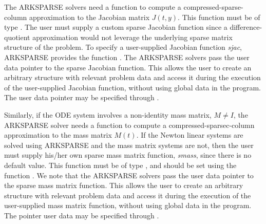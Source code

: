 \documentclass[letterpaper,10pt,english]{sphinxmanual}
\begin{document}
The ARKSPARSE solvers need a function to compute a
compressed-sparse-column approximation to the Jacobian matrix
\(J(t,y)\). This function must be of type
{\hyperref[c_interface/User_supplied:c.ARKSlsSparseJacFn]{\emph{}}}.  The user must supply a custom sparse
Jacobian function since a difference-quotient approximation would not
leverage the underlying sparse matrix structure of the problem.  To
specify a user-supplied Jacobian function \emph{sjac}, ARKSPARSE provides
the function {\hyperref[c_interface/User_callable:c.ARKSlsSetSparseJacFn]{\emph{}}}. The ARKSPARSE solvers
pass the user data pointer to the sparse Jacobian function.  This
allows the user to create an arbitrary structure with relevant problem
data and access it during the execution of the user-supplied Jacobian
function, without using global data in the program. The user
data pointer may be specified through {\hyperref[c_interface/User_callable:c.ARKodeSetUserData]{\emph{}}}.

Similarly, if the ODE system involves a non-identity mass matrix,
\(M\ne I\), the ARKSPARSE solver needs a function to compute a
compressed-sparsec-column approximation to the mass matrix
\(M(t)\).  If the Newton linear systems are solved using ARKSPARSE
and the mass matrix systems are not, then the user must supply his/her
own sparse mass matrix function, \emph{smass}, since there is no default
value.  This function must be of type {\hyperref[c_interface/User_supplied:c.ARKSlsSparseMassFn]{\emph{}}},
and should be set using the function
{\hyperref[c_interface/User_callable:c.ARKSlsSetSparseMassFn]{\emph{}}}.  We note that the ARKSPARSE solvers
pass the user data pointer to the sparse mass matrix function. This
allows the user to create an arbitrary structure with relevant problem
data and access it during the execution of the user-supplied mass
matrix function, without using global data in the program. The pointer
user data may be specified through {\hyperref[c_interface/User_callable:c.ARKodeSetUserData]{\emph{}}}.
\end{document}
